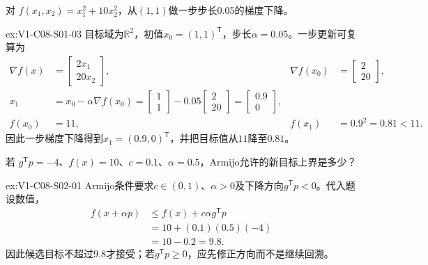 \begin{SLChapterExercisePairSection}
\begin{exercise}\label{ex:V1-C08-S01-03}
对 $f(x_1,x_2)=x_1^2+10x_2^2$，从$(1,1)$做一步步长0.05的梯度下降。
\end{exercise}
\label{sol:V1-C08-S01-03}
\begin{chapterexercisesolution}{ex:V1-C08-S01-03}
目标域为$\mathbb R^2$，初值$x_0=(1,1)^{\mathsf T}$，步长$\alpha=0.05$。一步更新可复算为
\[
\begin{aligned}
\nabla f(x)&=\begin{bmatrix}2x_1\\20x_2\end{bmatrix},
&\nabla f(x_0)&=\begin{bmatrix}2\\20\end{bmatrix},\\
x_1&=x_0-\alpha\nabla f(x_0)
=\begin{bmatrix}1\\1\end{bmatrix}
-0.05\begin{bmatrix}2\\20\end{bmatrix}
=\begin{bmatrix}0.9\\0\end{bmatrix},\\
f(x_0)&=11,
&f(x_1)&=0.9^2=0.81<11.
\end{aligned}
\]
因此一步梯度下降得到$x_1=(0.9,0)^{\mathsf T}$，并把目标值从$11$降至$0.81$。
\end{chapterexercisesolution}

\begin{exercise}\label{ex:V1-C08-S02-01}
若 $g^{\mathsf T}p=-4$、$f(x)=10$、$c=0.1$、$\alpha=0.5$，Armijo允许的新目标上界是多少？
\end{exercise}
\label{sol:V1-C08-S02-01}
\begin{chapterexercisesolution}{ex:V1-C08-S02-01}
Armijo条件要求$c\in(0,1)$、$\alpha>0$及下降方向$g^{\mathsf T}p<0$。代入题设数值，
\[
\begin{aligned}
f(x+\alpha p)
&\le f(x)+c\alpha g^{\mathsf T}p\\
&=10+(0.1)(0.5)(-4)\\
&=10-0.2=9.8.
\end{aligned}
\]
因此候选目标不超过$9.8$才接受；若$g^{\mathsf T}p\ge0$，应先修正方向而不是继续回溯。
\end{chapterexercisesolution}


\end{SLChapterExercisePairSection}
